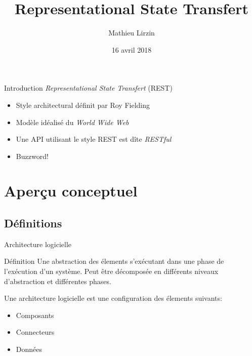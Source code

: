 \documentclass{beamer}
\title{Representational State Transfert}
\author{Mathieu Lirzin}
\institute{Néréide}
\date{16 avril 2018}
\begin{document}
\begin{frame}
  \titlepage
\end{frame}

\begin{frame}{Introduction}
  \emph{Representational State Transfert} (REST)
  \begin{itemize}
  \item Style architectural définit par Roy Fielding
  \item Modèle idéalisé du \emph{World Wide Web}
  \item Une API utilisant le style REST est dîte \emph{RESTful}
  \item Buzzword!
  \end{itemize}

\end{frame}

\section{Aperçu conceptuel}

\subsection{Définitions}

\begin{frame}{Architecture logicielle}
  \begin{block}{Définition}
    Une abstraction des élements s'exécutant dans une phase de
    l'exécution d'un système.  Peut être décomposée en différents
    niveaux d'abstraction et différentes phases.
  \end{block}

  \begin{block}{}
    Une architecture logicielle est une configuration des élements
    suivants:
    \begin{itemize}
    \item Composants
    \item Connecteurs
    \item Données
    \end{itemize}
  \end{block}
\end{frame}
\end{document}

